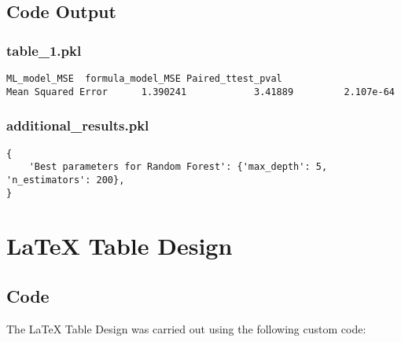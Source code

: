 \documentclass[11pt]{article}
\begin{document}
\subsection{Code Output}

\subsubsection*{table\_1.pkl}

\begin{Verbatim}[tabsize=4]
                    ML_model_MSE  formula_model_MSE Paired_ttest_pval
Mean Squared Error      1.390241            3.41889         2.107e-64
\end{Verbatim}

\subsubsection*{additional\_results.pkl}

\begin{Verbatim}[tabsize=4]
{
    'Best parameters for Random Forest': {'max_depth': 5, 'n_estimators': 200},
}
\end{Verbatim}

\section{LaTeX Table Design}
\subsection{{Code}}
The LaTeX Table Design was carried out using the following custom code:
\end{document}
